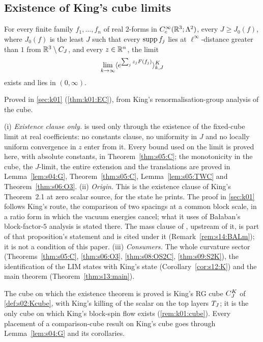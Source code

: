 \subsection{Existence of King's cube limits}

\begin{theorem}\label{hyp:s03:EC}
For every finite family $f_1,\dots,f_n$ of real $2$-forms in $C^\infty_c(\mathbb R^3;\Lambda^2)$, every $J\ge J_0(f)$, where $J_0(f)$ is the least $J$ such that every $\operatorname{supp} f_j$ lies at $\ell^\infty$-distance greater than $1$ from $\mathbb R^3\setminus C_J$, and every $z\in\mathbb R^n$, the limit
\[
\lim_{k\to\infty}\langle e^{\sum_j z_jF(f_j)}\rangle^{K}_{k,J}
\]
exists and lies in $(0,\infty)$.
\end{theorem}
Proved in \cref{sec:k01} (\cref{thm:k01:EC}), from King's renormalisation-group analysis of the cube.

\begin{remark}\label{rem:s03:EC}
(i) \emph{Existence clause only.}  is used only through the existence of the fixed-cube limit at real coefficients: no constants clause, no uniformity in $J$ and no locally uniform convergence in $z$ enter from it. Every bound used on the limit is proved here, with absolute constants, in Theorem~\ref{thm:s05:C}; the monotonicity in the cube, the $J$-limit, the entire extension and the translations are proved in Lemma~\ref{lem:s04:G}, Theorem~\ref{thm:s05:C}, Lemma~\ref{lem:s05:TWC} and Theorem~\ref{thm:s06:O3}.
(ii) \emph{Origin.} This is the existence clause of King's Theorem~2.1 \cite{K2} at zero scalar source, for the state he prints. The proof in \cref{sec:k01} follows King's route, the comparison of two spacings at a common block scale, in a ratio form in which the vacuum energies cancel; what it uses of Ba{\l}aban's block-factor-$5$ analysis \cite{Ba1,Ba2,Ba3,Ba4} is stated there. The mass clause of \cite[Prop.~3.1]{Ba2}, upstream of it, is part of that proposition's statement and is cited under it (Remark~\ref{rem:s14:BALm}); it is not a condition of this paper.
(iii) \emph{Consumers.} The whole curvature sector (Theorems~\ref{thm:s05:C}, \ref{thm:s06:O3}, \ref{thm:s08:OS2C}, \ref{thm:s09:S2K}), the identification of the LIM states with King's state (Corollary~\ref{cor:s12:K}) and the main theorem (Theorem~\ref{thm:s13:main}).
\end{remark}

\begin{remark}\label{rem:s03:cube-identification}
The cube on which the existence theorem is proved is King's RG cube $C^{K}_{J}$ of \cref{def:s02:Kcube}, with King's killing of the scalar on the top layers $T_J$; it is the only cube on which King's block-spin flow exists (\cref{rem:k01:cube}). Every placement of a comparison-cube result on King's cube goes through Lemma~\ref{lem:s04:G} and its corollaries.
\end{remark}

